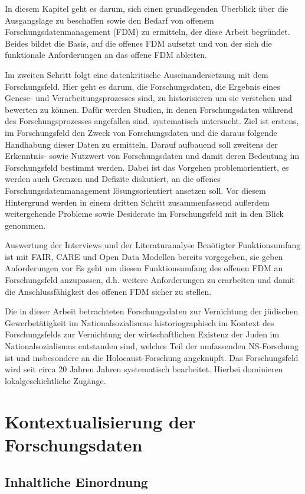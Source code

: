 \onehalfspacing

In diesem Kapitel geht es darum, sich einen grundlegenden Überblick über die Ausgangslage zu beschaffen sowie den Bedarf von offenem Forschungsdatenmanagement (FDM) zu ermitteln, der diese Arbeit begründet. Beides bildet die Basis, auf die offenes FDM aufsetzt und von der sich die funktionale Anforderungen an das offene FDM ableiten. 

Im zweiten Schritt folgt eine datenkritische Auseinandersetzung mit dem Forschungsfeld. Hier geht es darum, die Forschungsdaten, die Ergebnis eines Genese- und Verarbeitungsprozesses sind, zu historisieren um sie verstehen und bewerten zu können. Dafür werden Studien, in denen Forschungsdaten während des Forschungsprozesses angefallen sind, systematisch untersucht. Ziel ist erstens, im Forschungsfeld den Zweck von Forschungsdaten und die daraus folgende Handhabung dieser Daten zu ermitteln. Darauf aufbauend soll zweitens der Erkenntnis- sowie Nutzwert von Forschungsdaten und damit deren Bedeutung im Forschungsfeld bestimmt werden. Dabei ist das Vorgehen problemorientiert, es werden auch Grenzen und Defizite diskutiert, an die offenes Forschungsdatenmanagement lösungsorientiert ansetzen soll. Vor diesem Hintergrund werden in einem dritten Schritt zusammenfassend außerdem weitergehende Probleme sowie Desiderate im Forschungsfeld mit in den Blick genommen.

Auswertung der Interviews und der Literaturanalyse
Benötigter Funktionsumfang ist mit FAIR, CARE und Open Data Modellen bereits vorgegeben, sie geben Anforderungen vor
Es geht um diesen Funktionsumfang des offenen FDM an Forschungsfeld anzupassen, d.h. weitere Anforderungen zu erarbeiten und damit die Anschlussfähigkeit des offenen FDM sicher zu stellen.

Die in dieser Arbeit betrachteten Forschungsdaten zur Vernichtung der jüdischen Gewerbetätigkeit im Nationalsozialismus historiographisch im Kontext des Forschungsfelds zur Vernichtung der wirtschaftlichen Existenz der Juden im Nationalsozialismus entstanden sind, welches Teil der umfassenden NS-Forschung ist und insbesondere an die Holocaust-Forschung angeknüpft. Das Forschungsfeld wird seit circa 20 Jahren Jahren systematisch bearbeitet. Hierbei dominieren lokalgeschichtliche Zugänge. 


\section{Kontextualisierung der Forschungsdaten}
\subsection{Inhaltliche Einordnung} 

